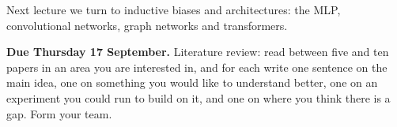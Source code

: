 \documentclass[11pt]{article}
\begin{document}
\medskip
\noindent
Next lecture we turn to inductive biases and architectures: the MLP, convolutional
networks, graph networks and transformers.

\vspace{0.6em}
\noindent\textbf{\color{accent}Due Thursday 17 September.} Literature review: read between
five and ten papers in an area you are interested in, and for each write one sentence on
the main idea, one on something you would like to understand better, one on an experiment
you could run to build on it, and one on where you think there is a gap. Form your team.
\end{document}
